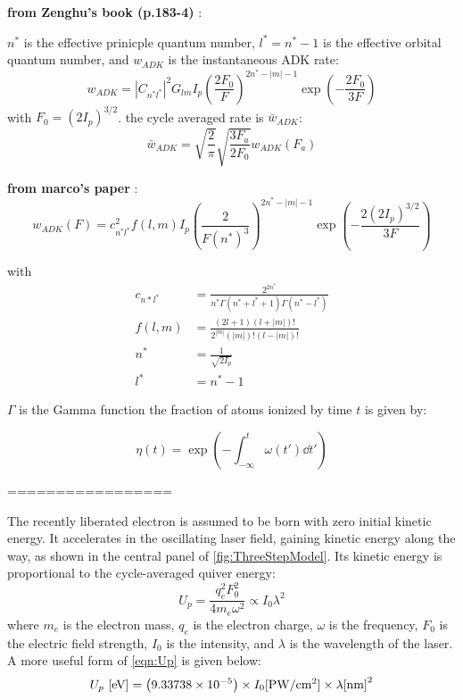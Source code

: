 \textbf{from Zenghu's book (p.183-4)} \cite{changFundamentalsAttosecondOptics2011}:

$n^*$ is the effective prinicple quantum number, $l^* = n^* -1 $ is the effective orbital quantum number, and $w_{ADK}$ is the instantaneous ADK rate:
\begin{equation}
w_{ADK} = \left|C_{n^*l^*}\right|^2 G_{lm} I_p \left( \frac{2 F_0}{F} \right)^{2n^*-|m|-1} \exp \left(-\frac{2 F_0}{3 F}\right)
\end{equation}
with $F_0 = (2 I_p)^{3/2}$.
the cycle averaged rate is $\bar{w}_{ADK}$:
\begin{equation}
\bar{w}_{ADK} = \sqrt{\frac{2}{\pi}} \sqrt{\frac{3 F_a}{2 F_0}} w_{ADK} (F_a)
\end{equation}

\textbf{from marco's paper} \cite{laiExperimentalInvestigationStrongfieldionization2017}:
\begin{equation}
w_{ADK}(F) = c^2_{n^*l^*} f(l,m) I_p \left( \frac{2}{F (n^*)^3} \right)^{2n^*-|m|-1} \exp \left( - \frac{2 (2 I_p)^{3/2}}{3F} \right)
\end{equation}

with
\begin{align}
c_{n*l^*} &= \frac{2^{2n^*}}{n^* \Gamma(n^* + l^* + 1) \Gamma(n^* - l^*)}  \\
f(l,m) &= \frac{(2l+1)(l+|m|)!}{2^{|m|} (|m|)! (l-|m|)!}\\
n^* &= \frac{1}{\sqrt{2I_p}}\\
l^* &= n^* - 1 
\end{align}

$\Gamma$ is the Gamma function
the fraction of atoms ionized by time $t$ is given by:

\begin{equation}
\eta(t) = \exp \left( - \int_{-\infty}^{t} \omega(t') \dd{t'} \right)
\end{equation}

=================


The recently liberated electron is assumed to be born with zero initial kinetic energy. It accelerates in the oscillating laser field, gaining kinetic energy along the way, as shown in the central panel of \cref{fig:ThreeStepModel}. Its kinetic energy is proportional to the cycle-averaged quiver energy:
\begin{equation}
U_p = \frac{q_e^2 F_0^2}{4 m_e \omega^2} \propto I_0 \lambda^2
\label{eqn:Up}
\end{equation}
where $m_e$ is the electron mass, $q_e$ is the electron charge, $\omega$ is the frequency, $F_0$ is the electric field strength, $I_0$ is the intensity, and $\lambda$ is the wavelength of the laser. A more useful form of \cref{eqn:Up} is given below:
\begin{equation}
U_p \textrm{ [eV]} = \left( 9.33738 \times 10^{-5} \right) \times I_0 \textrm{[PW/cm\textsuperscript{2}]} \times \lambda\textrm{[nm]}^2
\end{equation}

